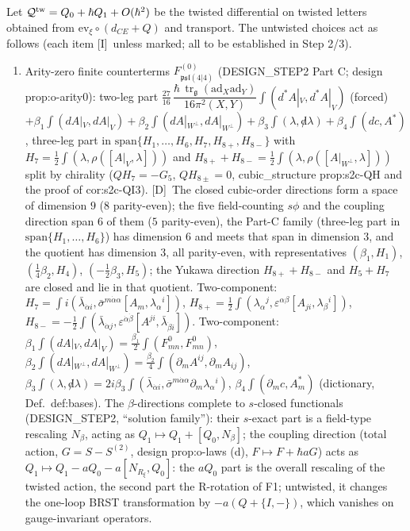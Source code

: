 \documentclass[11pt]{article}
\theoremstyle{definition}
\newcommand{\tr}{\operatorname{tr}}
\newcommand{\Dl}{\textup{[D]}}
\newcommand{\Il}{\textup{[I]}}
\newcommand{\unit}{\dfrac{\hbar\,\tr_{\mathfrak g}(\mathrm{ad}_X\mathrm{ad}_Y)}{16\pi^2(X,Y)}}
\begin{document}
Let $\mathcal Q^{\rm tw}=Q_0+\hbar Q_1+O(\hbar^2)$ be the twisted differential on twisted letters obtained from $\mathrm{ev}_\xi\circ(d_{CE}+Q)$ and transport. The untwisted choices act as follows (each item \Il\ unless marked; all to be established in Step 2/3).
\begin{enumerate}
\item[F0.] Arity-zero finite counterterms $F^{(0)}_{\mathfrak{psl}(4|4)}$ (DESIGN\_STEP2 Part C; design prop:o-arity0): two-leg part $\frac{27}{16}\,\unit\int(d^*A|_V,d^*A|_V)$ (forced) $+\beta_1\int(dA|_V,dA|_V)+\beta_2\int(dA|_{W^\perp},dA|_{W^\perp})+\beta_3\int(\lambda,{\not d}\lambda)+\beta_4\int(dc,A^*)$, three-leg part in $\mathrm{span}\{H_1,\dots,H_6,H_7,H_{8+},H_{8-}\}$ with $H_7=\tfrac12\int(\lambda,\rho([A|_V,\lambda]))$ and $H_{8+}+H_{8-}=\tfrac12\int(\lambda,\rho([A|_{W^\perp},\lambda]))$ split by chirality ($QH_7=-G_5$, $QH_{8\pm}=0$, cubic\_structure prop:s2c-QH and the proof of cor:s2c-QI3). \Dl\ The closed cubic-order directions form a space of dimension $9$ ($8$ parity-even); the five field-counting $s\phi$ and the coupling direction span $6$ of them ($5$ parity-even), the Part-C family (three-leg part in $\mathrm{span}\{H_1,\dots,H_6\}$) has dimension $6$ and meets that span in dimension $3$, and the quotient has dimension $3$, all parity-even, with representatives $(\beta_1,H_1)$, $(\tfrac14\beta_2,H_4)$, $(-\tfrac12\beta_3,H_5)$; the Yukawa direction $H_{8+}+H_{8-}$ and $H_5+H_7$ are closed and lie in that quotient. Two-component: $H_7=\int i(\bar\lambda_{\dot\alpha i},\bar\sigma^{m\dot\alpha\alpha}[A_m,\lambda_\alpha{}^i])$, $H_{8+}=\tfrac12\int(\lambda_\alpha{}^j,\varepsilon^{\alpha\beta}[A_{ji},\lambda_\beta{}^i])$, $H_{8-}=-\tfrac12\int(\bar\lambda_{\dot\alpha j},\varepsilon^{\dot\alpha\dot\beta}[A^{ji},\bar\lambda_{\dot\beta i}])$. Two-component: $\beta_1\int(dA|_V,dA|_V)=\frac{\beta_1}2\int(F^0_{mn},F^0_{mn})$, $\beta_2\int(dA|_{W^\perp},dA|_{W^\perp})=\frac{\beta_2}4\int(\partial_mA^{ij},\partial_mA_{ij})$, $\beta_3\int(\lambda,{\not d}\lambda)=2i\beta_3\int(\bar\lambda_{\dot\alpha i},\bar\sigma^{m\dot\alpha\alpha}\partial_m\lambda_\alpha{}^i)$, $\beta_4\int(\partial_mc,A^*_m)$ (dictionary, Def.~def:bases). The $\beta$-directions complete to $s$-closed functionals (DESIGN\_STEP2, ``solution family''): their $s$-exact part is a field-type rescaling $N_\beta$, acting as $Q_1\mapsto Q_1+[Q_0,N_\beta]$; the coupling direction (total action, $G=S-S^{(2)}$, design prop:o-laws (d), $F\mapsto F+\hbar aG$) acts as $Q_1\mapsto Q_1-aQ_0-a[N_{R_\xi},Q_0]$: the $aQ_0$ part is the overall rescaling of the twisted action, the second part the R-rotation of F1; untwisted, it changes the one-loop BRST transformation by $-a(Q+\{I,-\})$, which vanishes on gauge-invariant operators.

\end{enumerate}
\end{document}
